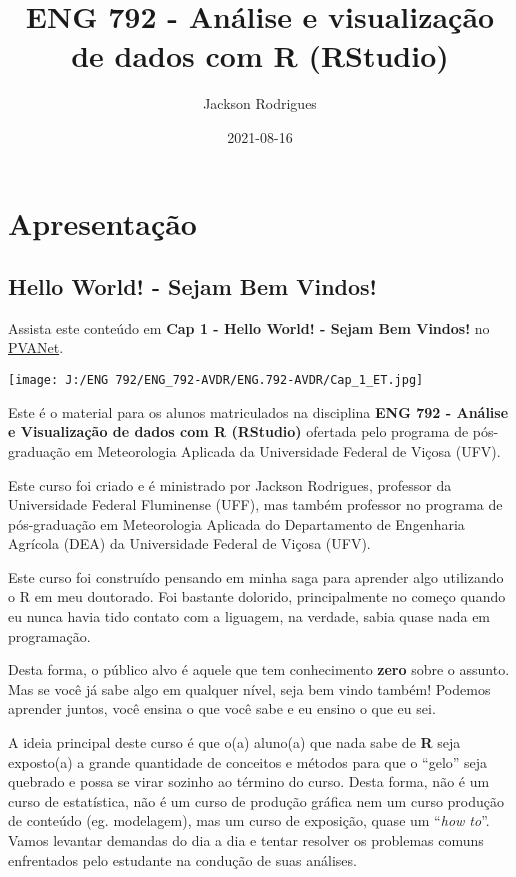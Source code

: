 \documentclass[
]{book}
\title{ENG 792 - Análise e visualização de dados com R (RStudio)}
\author{Jackson Rodrigues}
\date{2021-08-16}
\begin{document}
\maketitle

{
\setcounter{tocdepth}{1}
\tableofcontents
}
\hypertarget{apresentauxe7uxe3o}{%
\chapter{Apresentação}\label{apresentauxe7uxe3o}}

\hypertarget{hello-world---sejam-bem-vindos}{%
\section{Hello World! - Sejam Bem Vindos!}\label{hello-world---sejam-bem-vindos}}

Assista este conteúdo em \textbf{Cap 1 - Hello World! - Sejam Bem Vindos!} no \href{https://www2.cead.ufv.br/sistemas/pvanet/geral/login.php}{PVANet}.

\texttt{[image: J:/ENG 792/ENG\_792-AVDR/ENG.792-AVDR/Cap\_1\_ET.jpg]}

Este é o material para os alunos matriculados na disciplina \textbf{ENG 792 - Análise e Visualização de dados com R (RStudio)} ofertada pelo programa de pós-graduação em Meteorologia Aplicada da Universidade Federal de Viçosa (UFV).

Este curso foi criado e é ministrado por Jackson Rodrigues, professor da Universidade Federal Fluminense (UFF), mas também professor no programa de pós-graduação em Meteorologia Aplicada do Departamento de Engenharia Agrícola (DEA) da Universidade Federal de Viçosa (UFV).

Este curso foi construído pensando em minha saga para aprender algo utilizando o R em meu doutorado. Foi bastante dolorido, principalmente no começo quando eu nunca havia tido contato com a liguagem, na verdade, sabia quase nada em programação.

Desta forma, o público alvo é aquele que tem conhecimento \textbf{zero} sobre o assunto. Mas se você já sabe algo em qualquer nível, seja bem vindo também! Podemos aprender juntos, você ensina o que você sabe e eu ensino o que eu sei.

A ideia principal deste curso é que o(a) aluno(a) que nada sabe de \textbf{R} seja exposto(a) a grande quantidade de conceitos e métodos para que o ``gelo'' seja quebrado e possa se virar sozinho ao término do curso. Desta forma, não é um curso de estatística, não é um curso de produção gráfica nem um curso produção de conteúdo (eg. modelagem), mas um curso de exposição, quase um ``\emph{how to}''. Vamos levantar demandas do dia a dia e tentar resolver os problemas comuns enfrentados pelo estudante na condução de suas análises.
\end{document}
